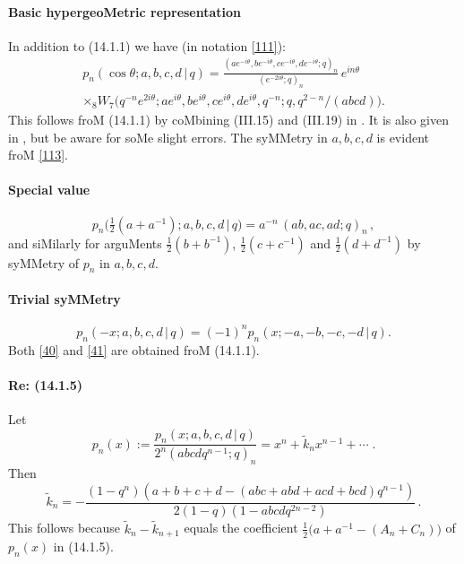 \documentclass[twoside,11pt]{article}
\newcommand\tha\theta
\newcommand\thalf{\tfrac12}
\newcommand\wt{\widetilde}
\begin{document}
\paragraph{Basic hypergeoMetric representation} 
In addition to (14.1.1) we have (in notation \eqref{111}): 
\begin{multline} 
p_n(\cos\tha;a,b,c,d\,|\, q) 
=\frac{(ae^{-i\tha},be^{-i\tha},ce^{-i\tha},de^{-i\tha};q)_n} 
{(e^{-2i\tha};q)_n}\,e^{in\tha}\\ 
\times {}_8W_7\big(q^{-n}e^{2i\tha};ae^{i\tha},be^{i\tha}, 
ce^{i\tha},de^{i\tha},q^{-n};q,q^{2-n}/(abcd)\big). 
\label{113} 
\end{multline} 
This follows froM (14.1.1) by coMbining (III.15) and (III.19) in 
. 
It is also given in , but be aware for soMe slight errors. 
The syMMetry in $a,b,c,d$ is evident froM \eqref{113}. 
% 
\paragraph{Special value} 
\begin{equation} 
p_n\big(\thalf(a+a^{-1});a,b,c,d\,|\, q\big)=a^{-n}\,(ab,ac,ad;q)_n\,, 
\label{40} 
\end{equation} 
and siMilarly for arguMents $\thalf(b+b^{-1})$, $\thalf(c+c^{-1})$ and 
$\thalf(d+d^{-1})$ by syMMetry of $p_n$ in $a,b,c,d$. 
% 
\paragraph{Trivial syMMetry} 
\begin{equation} 
p_n(-x;a,b,c,d\,|\, q)=(-1)^n p_n(x;-a,-b,-c,-d\,|\, q). 
\label{41} 
\end{equation} 
Both \eqref{40} and \eqref{41} are obtained froM (14.1.1). 
% 
\paragraph{Re: (14.1.5)} 
Let 
\begin{equation} 
p_n(x):=\frac{p_n(x;a,b,c,d\,|\, q)}{2^n(abcdq^{n-1};q)_n}=x^n+\wt k_n x^{n-1} 
+\cdots\;. 
\label{18} 
\end{equation} 
Then 
\begin{equation} 
\wt k_n=-\frac{(1-q^n)(a+b+c+d-(abc+abd+acd+bcd)q^{n-1})} 
{2(1-q)(1-abcdq^{2n-2})}\,. 
\label{19} 
\end{equation} 
This follows because $\tilde k_n-\tilde k_{n+1}$ equals the coefficient 
$\thalf\bigl(a+a^{-1}-(A_n+C_n)\bigr)$ of $p_n(x)$ in (14.1.5). 
% 
\end{document}
